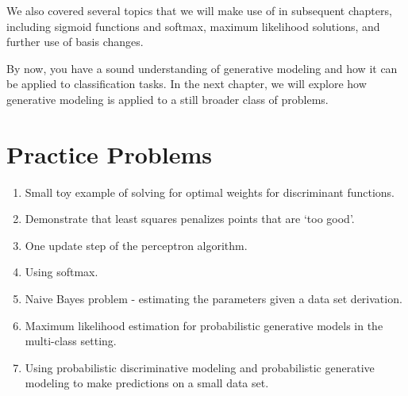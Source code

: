 We also covered several topics that we will make use of in subsequent chapters, including sigmoid functions and softmax, maximum likelihood solutions, and further use of basis changes.

By now, you have a sound understanding of generative modeling and how it can be applied to classification tasks. In the next chapter, we will explore how generative modeling is applied to a still broader class of problems.

\section{Practice Problems}
\begin{enumerate}
    \item Small toy example of solving for optimal weights for discriminant functions.
    \item Demonstrate that least squares penalizes points that are `too good'.
    \item One update step of the perceptron algorithm.
    \item Using softmax.
    \item Naive Bayes problem - estimating the parameters given a data set derivation.
    \item Maximum likelihood estimation for probabilistic generative models in the multi-class setting.
    \item Using probabilistic discriminative modeling and probabilistic generative modeling to make predictions on a small data set.
\end{enumerate}